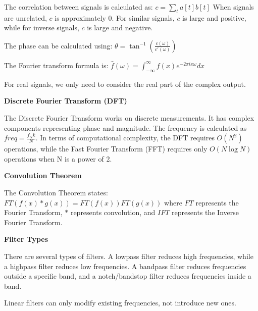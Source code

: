 \documentclass{article}
\begin{document}
The correlation between signals is calculated as:
$c = \sum_t a[t]b[t]$
When signals are unrelated, $c$ is approximately 0. For similar signals, $c$ is large and positive, while for inverse signals, $c$ is large and negative.

The phase can be calculated using:
$\theta = \tan^{-1}\left(\frac{c(\omega)}{c'(\omega)}\right)$

The Fourier transform formula is:
$\hat{f}(\omega) = \int_{-\infty}^{\infty} f(x)e^{-2\pi ix\omega}dx$

For real signals, we only need to consider the real part of the complex output.

\textbf{Discrete Fourier Transform (DFT)}

The Discrete Fourier Transform works on discrete measurements. It has complex components representing phase and magnitude. The frequency is calculated as $freq = \frac{f_N k}{N}$. In terms of computational complexity, the DFT requires $O(N^2)$ operations, while the Fast Fourier Transform (FFT) requires only $O(N\log N)$ operations when N is a power of 2.

\textbf{Convolution Theorem}

The Convolution Theorem states:
$FT(f(x) * g(x)) = FT(f(x))FT(g(x))$
where $FT$ represents the Fourier Transform, $*$ represents convolution, and $IFT$ represents the Inverse Fourier Transform.

\textbf{Filter Types}

There are several types of filters. A lowpass filter reduces high frequencies, while a highpass filter reduces low frequencies. A bandpass filter reduces frequencies outside a specific band, and a notch/bandstop filter reduces frequencies inside a band.

Linear filters can only modify existing frequencies, not introduce new ones.
\end{document}
